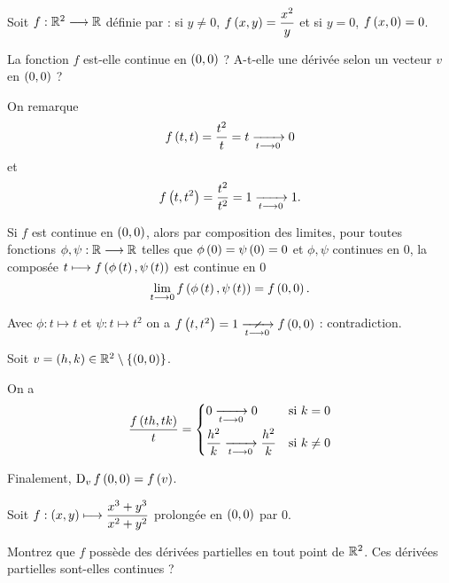 \begin{exo}
Soit \(f:\mathbb{R}^2\longrightarrow\mathbb{R}\) définie par : si \(y\not=0\), \(f\left(x,y\right)=\dfrac{x^2}{y}\) et si \(y=0\), \(f\left(x,0\right)=0\).

La fonction \(f\) est-elle continue en \(\left(0,0\right)\) ? A-t-elle une dérivée selon un vecteur \(v\) en \(\left(0,0\right)\) ?
\end{exo}

\begin{corr}
On remarque \[f\left(t,t\right)=\dfrac{t^2}{t}=t\xrightarrow[t\longrightarrow0]{}0\] et \[f\left(t,t^2\right)=\dfrac{t^2}{t^2}=1\xrightarrow[t\longrightarrow0]{}1.\]

Si \(f\) est continue en \(\left(0,0\right)\), alors par composition des limites, pour toutes fonctions \(\phi,\psi:\mathbb{R}\longrightarrow\mathbb{R}\) telles que \(\phi\left(0\right)=\psi\left(0\right)=0\) et \(\phi,\psi\) continues en \(0\), la composée \(t\longmapsto f\left(\phi\left(t\right),\psi\left(t\right)\right)\) est continue en \(0\) \ie \[\lim_{t\longrightarrow0}f\left(\phi\left(t\right),\psi\left(t\right)\right)=f\left(0,0\right).\]

Avec \(\phi:t\mapsto t\) et \(\psi:t\mapsto t^2\) on a \(f\paren{t,t^2}=1\ntendqd{t\to0}f\paren{0,0}\) : contradiction.

Soit \(v=\left(h,k\right)\in\mathbb{R}^2\setminus\left\lbrace\left(0,0\right)\right\rbrace\).

On a \[\dfrac{f\left(th,tk\right)}{t}=\begin{dcases}
0\xrightarrow[t\longrightarrow0]{}0 &\text{si }k=0 \\
\dfrac{h^2}{k}\xrightarrow[t\longrightarrow0]{}\dfrac{h^2}{k} &\text{si }k\not=0
\end{dcases}\]

Finalement, \(\operatorname{D}_{v}f\left(0,0\right)=f\left(v\right)\).
\end{corr}

\begin{exo}
Soit \(f:\left(x,y\right)\longmapsto\dfrac{x^3+y^3}{x^2+y^2}\) prolongée en \(\left(0,0\right)\) par \(0\).

Montrez que \(f\) possède des dérivées partielles en tout point de \(\mathbb{R}^2\). Ces dérivées partielles sont-elles continues ?
\end{exo}

